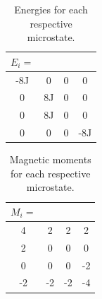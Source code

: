 \documentclass[12pt]{article}
\begin{document}
\begin{table}
\begin{center}
	\begin{tabular}{c c c c}
	$E_i =$& & &\\
	\hline
	-8J & 0 & 0 & 0\\
	0 & 8J & 0 & 0\\
	0 & 8J & 0 & 0\\
	0 & 0 & 0 & -8J\\
	\hline
	\end{tabular}
\caption{Energies for each respective microstate.}
\label{table:All_energies}
\end{center}
\end{table}

\begin{table}
\begin{center}
	\begin{tabular}{c c c c}
	$M_i = $& & & \\
	\hline
	4 & 2 & 2 & 2\\
	2 & 0 & 0 & 0\\
	0 & 0 & 0 & -2\\
	-2 & -2 & -2 & -4\\
	\hline
	\end{tabular}
\caption{Magnetic moments for each respective microstate.}
\label{table:All_magnetic_moment}
\end{center}
\end{table}
\end{document}
